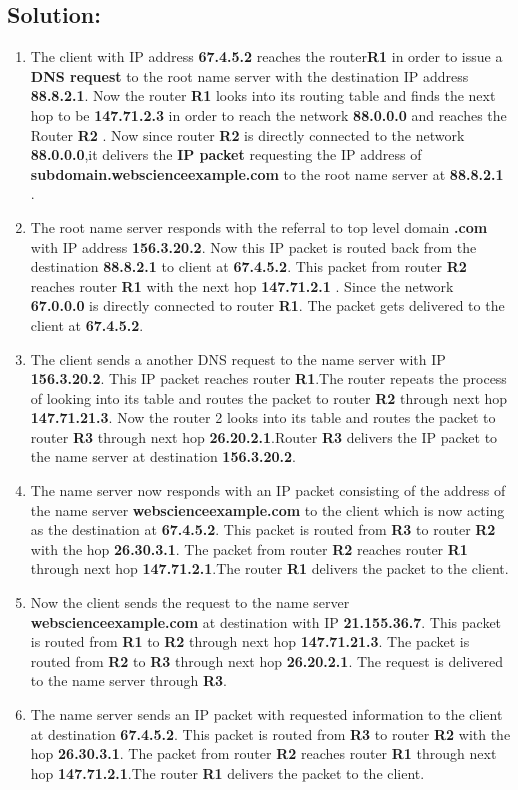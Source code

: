 \documentclass{resources/WeSTassignment}
\begin{document}
\subsection{Solution:}
\begin{enumerate}
\item The client with IP address \textbf{67.4.5.2} reaches the router\textbf{R1} in order to issue a \textbf{DNS request} to the root name server with the destination IP address \textbf{88.8.2.1}. Now the router \textbf{R1} looks into its routing table and finds the next hop to be \textbf{147.71.2.3} in order to reach the network \textbf{88.0.0.0} and reaches the Router \textbf{R2} . Now since router \textbf{R2} is directly connected to the network \textbf{88.0.0.0},it delivers the \textbf{IP packet} requesting the IP address of \textbf{subdomain.webscienceexample.com} to the root name server at   \textbf{88.8.2.1} .
\item The root name server responds with the referral to top level domain \textbf{.com} with IP address \textbf{156.3.20.2}. Now this IP packet is routed back from the destination \textbf{88.8.2.1} to client at \textbf{67.4.5.2}. This packet from router \textbf{R2} reaches router \textbf{R1} with the next hop \textbf{147.71.2.1} . Since the network \textbf{67.0.0.0} is directly connected to router \textbf{R1}. The packet gets delivered to the client at \textbf{67.4.5.2}.
\item The client sends a another DNS request to the name server with IP \textbf{156.3.20.2}. This IP packet reaches router \textbf{R1}.The router repeats the process of looking into its table and routes the packet to router \textbf{R2} through next hop \textbf{147.71.21.3}. Now the router 2 looks into its table and routes the packet to router \textbf{R3} through next hop \textbf{26.20.2.1}.Router \textbf{R3} delivers the IP packet to the name server at destination \textbf{156.3.20.2}. 
\item The name server now responds with an IP packet consisting of the address of the name server \textbf{webscienceexample.com} to the client which is now acting as the destination at \textbf{67.4.5.2}. This packet is routed from \textbf{R3} to router \textbf{R2} with the hop \textbf{26.30.3.1}. The packet from router \textbf{R2} reaches router \textbf{R1} through next hop \textbf{147.71.2.1}.The router \textbf{R1} delivers the packet to the client.
\item Now the client sends the request to the name server \textbf{webscienceexample.com} at destination with IP \textbf{21.155.36.7}. This packet is routed from \textbf{R1} to \textbf{R2} through next hop \textbf{147.71.21.3}. The packet is routed from \textbf{R2} to \textbf{R3} through next hop \textbf{26.20.2.1}. The request is delivered to the name server through \textbf{R3}.
\item The name server sends an IP packet with requested information to the client at destination \textbf{67.4.5.2}. This packet is routed from \textbf{R3} to router \textbf{R2} with the hop \textbf{26.30.3.1}. The packet from router \textbf{R2} reaches router \textbf{R1} through next hop \textbf{147.71.2.1}.The router \textbf{R1} delivers the packet to the client.


\end{enumerate}
\end{document}
